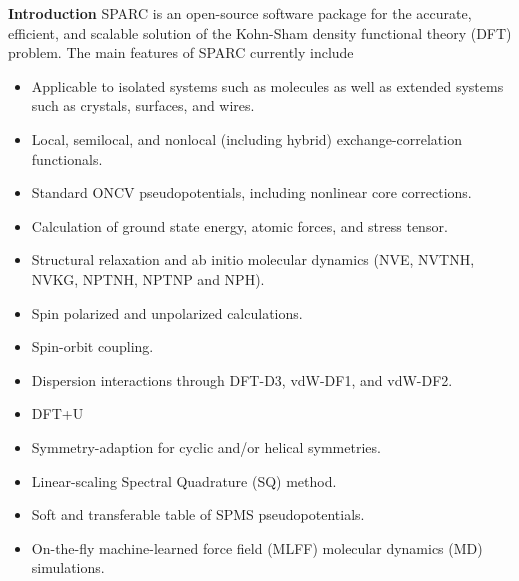 \renewcommand{\thefootnote}{\fnsymbol{footnote}}

\begin{frame}[allowframebreaks]{\textbf{Introduction}} \label{Introduction}
  SPARC is an open-source software package for the accurate, efficient, and scalable solution of the Kohn-Sham density functional theory (DFT) problem. The main features of SPARC currently include
  \begin{itemize}
    \item Applicable to isolated systems such as molecules as well as extended systems such as crystals, surfaces, and wires.
    \item Local, semilocal, and nonlocal (including hybrid) exchange-correlation functionals.
    \item Standard ONCV pseudopotentials, including nonlinear core corrections.
    \item Calculation of ground state energy, atomic forces, and stress tensor.
    \item Structural relaxation and ab initio molecular dynamics (NVE, NVTNH, NVKG, NPTNH, NPTNP and NPH).
    \item Spin polarized and unpolarized calculations.
    \item Spin-orbit coupling.
    \item Dispersion interactions through DFT-D3, vdW-DF1, and vdW-DF2.
    \item DFT+U
    \item Symmetry-adaption for cyclic and/or helical symmetries.
    \item Linear-scaling Spectral Quadrature (SQ) method.
    \item Soft and transferable table of SPMS pseudopotentials.
    \item On-the-fly machine-learned force field (MLFF) molecular dynamics (MD) simulations.
  \end{itemize}
  
  \end{frame}

